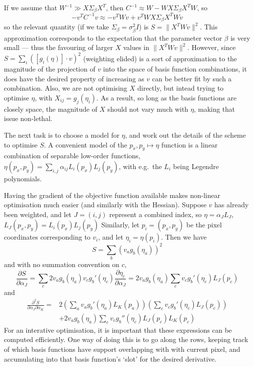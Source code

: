 If we assume that $W^{-1} \gg X \Sigma_\beta X^T$, then
$C^{-1} \approx W - W X \Sigma_\beta X^T W$, so
\[
- v^T C^{-1} v \approx  - v^T W v + v^T W X \Sigma_\beta X^T W v
\]
so the relevant quantity (if we take $\Sigma_\beta = \sigma_\beta^2
I$) is $S = \|X^T W v\|^2$. This approximation corresponds to the
expectation that the parameter vector $\beta$ is very small --- thus
the favouring of larger $X$ values in $\| X^T W v\|^2$. However, since
$S = \sum_i ([g_i(\eta)] \cdot v)^2$ (weighting elided) is a sort of
approximation to the magnitude of the projection of $v$ into the space of basis
function combinations, it does have the desired property of increasing
as $v$ can be better fit by such a combination. Also, we are
not optimising $X$ directly, but intead trying to optimise
$\eta$, with $X_{ij} = g_j (\eta_i)$. As a result, so long as the basis
functions are closely space, the magnitude of $X$ should not vary much
with $\eta$, making that issue non-lethal.

The next task is to choose a model for $\eta$, and work out the details
of the scheme to optimise $S$. A convenient model of the $p_x, p_y
\mapsto \eta$ function is a linear combination of separable low-order functions,
$\eta(p_x, p_y) = \sum_{i,j} \alpha_{ij}  L_i(p_x) L_j(p_y)$, with e.g.\
the $L_i$ being Legendre polynomials.

Having the gradient of the objective function available makes non-linear
optimisation much easier (and similarly with the Hessian). Suppose $v$ has
already been weighted, and let $J = (i,j)$ represent a combined index,
so $\eta = \alpha_J L_J$, $L_J(p_x, p_y) = L_i(p_x)L_j(p_y)$
Similarly, let $p_i = (p_x, p_y)$ be the pixel coordinates corresponding to $v_i$,
and let $\eta_i = \eta(p_i)$. Then we have
\[
S = \sum_b (v_a g_b (\eta_a))^2
\]
and with no summation convention on $c$, 
\[
\frac{\partial S}{\partial \alpha_J} = \sum_c 2 v_a g_b (\eta_a) v_c g_b' (\eta_c) \frac{
\partial \eta_c}{\partial \alpha_J}
= 2 v_a g_b (\eta_a) \sum_c v_c g_b'(\eta_c) L_J(p_c)
\]
and
\begin{align*}
\frac{\partial^2 S}{\partial \alpha_J \partial \alpha_K} = & 2
\left(\sum_a v_a g_b'(\eta_a) L_K (p_a)\right)
\left(\sum_c v_c g_b'(\eta_c) L_J (p_c)\right)
\\
 &+ 2 v_a g_b (\eta_a)
\sum_c v_c g_b''(\eta_c) L_J(p_c) L_K(p_c)
\end{align*}
%
For an interative optimisation, it is important that these expressions
can be computed efficiently. One way of doing this is to go along the
rows, keeping track of which basis functions have support overlapping
with with current pixel, and accumulating into that basis function's
`slot' for the desired derivative.
